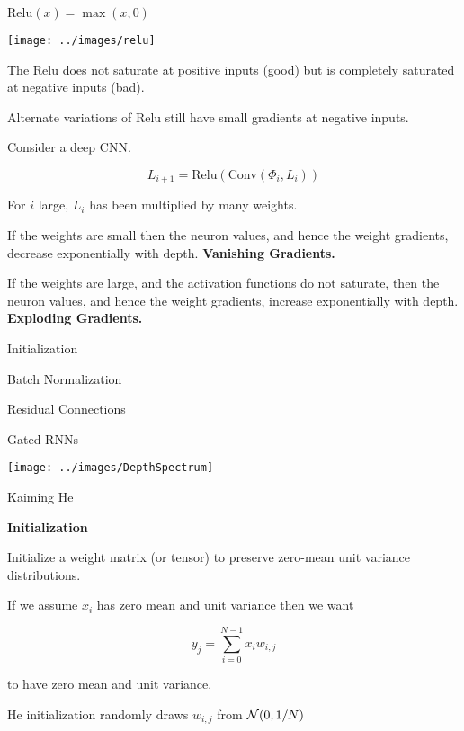 {

$\mathrm{Relu}(x) = \max(x,0)$

\vfill
\centerline{\texttt{[image: ../images/relu]}}

\vfill
The Relu does not saturate at positive inputs (good) but is completely saturated at negative inputs (bad).

\vfill
Alternate variations of Relu still have small gradients at negative inputs.


Consider a deep CNN.

$$L_{i+1} = \mathrm{Relu}(\mathrm{Conv}(\Phi_i,L_i))$$

\vfill
For $i$ large, $L_i$ has been multiplied by many weights.

\vfill
If the weights are small then the neuron values, and hence the weight gradients, decrease exponentially with depth. {\bf Vanishing Gradients.}

\vfill
If the weights are large, and the activation functions do not saturate, then the neuron values, and hence the weight gradients,
increase exponentially with depth. {\bf Exploding Gradients.}


\centerline{Initialization}

\vfill
\centerline{Batch Normalization}

\vfill
\centerline{Residual Connections}

\vfill
\centerline{Gated RNNs}


\centerline{\texttt{[image: ../images/DepthSpectrum]}}

\centerline{\large Kaiming He}

\slide{}
\centerline{\bf Initialization}
\vfill


Initialize a weight matrix (or tensor) to preserve zero-mean unit variance distributions.

\vfill
If we assume $x_i$ has zero mean and unit variance then we want

\vfill

$$y_j = \sum_{i=0}^{N-1} x_i w_{i,j}$$

\vfill
to have zero mean and unit variance.

\vfill
{\color{red} He initialization randomly draws $w_{i,j}$ from  ${\cal N}(0,1/N)$}

}
